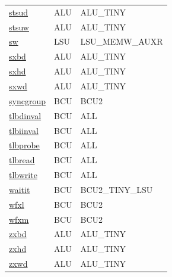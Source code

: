 \begin{small}
\begin{longtable}[l]{l l l}
\hyperlink{lvx.stsud}{stsud} & ALU & ALU\_TINY \\ 
\hyperlink{lvx.stsuw}{stsuw} & ALU & ALU\_TINY \\ 
\hyperlink{lvx.sw}{sw} & LSU & LSU\_MEMW\_AUXR \\ 
\hyperlink{lvx.sxbd}{sxbd} & ALU & ALU\_TINY \\ 
\hyperlink{lvx.sxhd}{sxhd} & ALU & ALU\_TINY \\ 
\hyperlink{lvx.sxwd}{sxwd} & ALU & ALU\_TINY \\ 
\hyperlink{lvx.syncgroup}{syncgroup} & BCU & BCU2 \\ 
\hyperlink{lvx.tlbdinval}{tlbdinval} & BCU & ALL \\ 
\hyperlink{lvx.tlbiinval}{tlbiinval} & BCU & ALL \\ 
\hyperlink{lvx.tlbprobe}{tlbprobe} & BCU & ALL \\ 
\hyperlink{lvx.tlbread}{tlbread} & BCU & ALL \\ 
\hyperlink{lvx.tlbwrite}{tlbwrite} & BCU & ALL \\ 
\hyperlink{lvx.waitit}{waitit} & BCU & BCU2\_TINY\_LSU \\ 
\hyperlink{lvx.wfxl}{wfxl} & BCU & BCU2 \\ 
\hyperlink{lvx.wfxm}{wfxm} & BCU & BCU2 \\ 
\hyperlink{lvx.zxbd}{zxbd} & ALU & ALU\_TINY \\ 
\hyperlink{lvx.zxhd}{zxhd} & ALU & ALU\_TINY \\ 
\hyperlink{lvx.zxwd}{zxwd} & ALU & ALU\_TINY \\ 
\end{longtable}\end{small}
